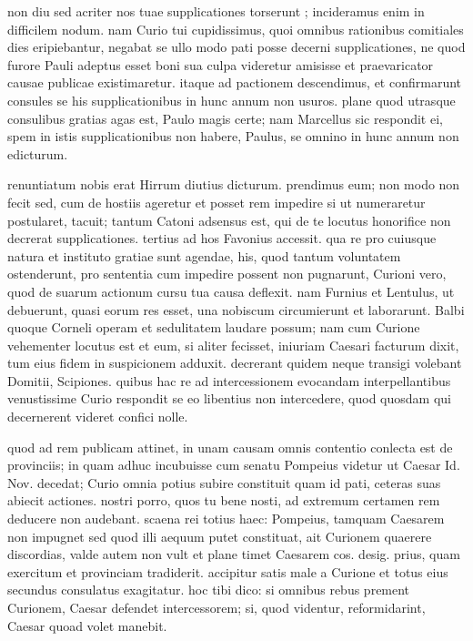 


 non diu sed acriter nos tuae supplicationes torserunt ; incideramus enim in difficilem nodum. nam Curio tui cupidissimus, quoi omnibus rationibus comitiales dies eripiebantur, negabat se ullo modo pati posse decerni supplicationes, ne quod furore Pauli adeptus esset boni sua culpa videretur amisisse et praevaricator causae publicae existimaretur. itaque ad pactionem descendimus, et confirmarunt consules se his supplicationibus in hunc annum non usuros. plane quod utrasque consulibus gratias agas est, Paulo magis certe; nam Marcellus sic respondit ei, spem in istis supplicationibus non habere, Paulus, se omnino in hunc annum non edicturum.

 renuntiatum nobis erat Hirrum diutius dicturum. prendimus eum; non modo non fecit sed, cum de hostiis ageretur et posset rem impedire si ut numeraretur postularet, tacuit; tantum Catoni adsensus est, qui de te locutus honorifice non decrerat supplicationes. tertius ad hos Favonius accessit. qua re pro cuiusque natura et instituto gratiae sunt agendae, his, quod tantum voluntatem ostenderunt, pro sententia cum impedire possent non pugnarunt, Curioni vero, quod de suarum actionum cursu tua causa deflexit. nam Furnius et Lentulus, ut debuerunt, quasi eorum res esset, una nobiscum circumierunt et laborarunt. Balbi quoque Corneli operam et sedulitatem laudare possum; nam cum Curione vehementer locutus est et eum, si aliter fecisset, iniuriam Caesari facturum dixit, tum eius fidem in suspicionem adduxit. decrerant quidem neque transigi volebant Domitii, Scipiones. quibus hac re ad intercessionem evocandam interpellantibus venustissime Curio respondit se eo libentius non intercedere, quod quosdam qui decernerent videret confici nolle.

 quod ad rem publicam attinet, in unam causam omnis contentio conlecta est de provinciis; in quam adhuc incubuisse cum senatu Pompeius videtur ut Caesar Id. Nov. decedat; Curio omnia potius subire constituit quam id pati, ceteras suas abiecit actiones. nostri porro, quos tu bene nosti, ad extremum certamen rem deducere non audebant. scaena rei totius haec: Pompeius, tamquam Caesarem non impugnet sed quod illi aequum putet constituat, ait Curionem quaerere discordias, valde autem non vult et plane timet Caesarem cos. desig. prius, quam exercitum et provinciam tradiderit. accipitur satis male a Curione et totus eius secundus consulatus exagitatur. hoc tibi dico: si omnibus rebus prement Curionem, Caesar defendet intercessorem; si, quod videntur, reformidarint, Caesar quoad volet manebit.

